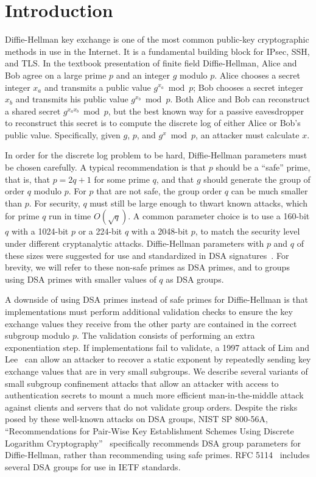 
\section{Introduction}

Diffie-Hellman key exchange is one of the most common public-key cryptographic
methods in use in the Internet. It is a fundamental building block for IPsec,
SSH, and TLS\@. In the textbook presentation of finite field Diffie-Hellman,
Alice and Bob agree on a large prime $p$ and an integer $g$ modulo $p$. Alice
chooses a secret integer $x_a$ and transmits a public value $g^{x_a} \bmod p$;
Bob chooses a secret integer $x_b$ and transmits his public value $g^{x_b}
\bmod p$. Both Alice and Bob can reconstruct a shared secret $g^{x_a x_b} \bmod
p$, but the best known way for a passive eavesdropper to reconstruct this
secret is to compute the discrete log of either Alice or Bob's public value.
Specifically, given $g$, $p$, and $g^x \bmod p$, an attacker must calculate
$x$.

In order for the discrete log problem to be hard, Diffie-Hellman parameters
must be chosen carefully. A typical recommendation is that $p$ should be a
``safe'' prime, that is, that $p = 2q+1$ for some prime $q$, and that $g$
should generate the group of order $q$ modulo $p$. For $p$ that are not safe,
the group order $q$ can be much smaller than $p$. For security, $q$ must still
be large enough to thwart known attacks, which for prime $q$ run in time
$O(\sqrt{q})$. A common parameter choice is to use a 160-bit $q$ with a
1024-bit $p$ or a 224-bit $q$ with a 2048-bit $p$, to match the security level
under different cryptanalytic attacks. Diffie-Hellman parameters with $p$ and
$q$ of these sizes were suggested for use and standardized in DSA
signatures~\cite{fips186}. For brevity, we will refer to these non-safe primes as
DSA primes, and to groups using DSA primes with smaller values of $q$ as  DSA
groups.

A downside of using DSA primes instead of safe primes for Diffie-Hellman is
that implementations must perform additional validation checks to ensure the
key exchange values they receive from the other party are contained in the
correct subgroup modulo $p$. The validation consists of performing an extra
exponentiation step. If implementations fail to validate, a 1997 attack of Lim
and Lee~\cite{lim-1997} can allow an attacker to recover a static exponent by
repeatedly sending key exchange values that are in very small subgroups. We
describe several variants of small subgroup confinement attacks that allow an
attacker with access to authentication secrets to mount a much more efficient
man-in-the-middle attack against clients and servers that do not validate group
orders. Despite the risks posed by these well-known attacks on DSA groups, NIST SP 800-56A, ``Recommendations
for Pair-Wise Key Establishment Schemes Using Discrete Logarithm
Cryptography''~\cite{barker2007sp} specifically recommends DSA group parameters
for Diffie-Hellman, rather than recommending using safe primes. RFC
5114~\cite{rfc5114} includes several DSA groups for use in IETF standards.

